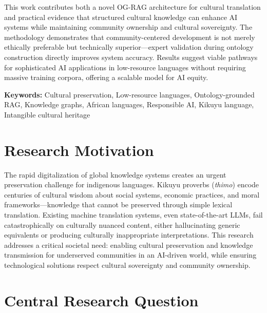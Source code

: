 \documentclass[11pt,a4paper]{article}
\begin{document}
This work contributes both a novel OG-RAG architecture for cultural translation and practical evidence that structured cultural knowledge can enhance AI systems while maintaining community ownership and cultural sovereignty. The methodology demonstrates that community-centered development is not merely ethically preferable but technically superior---expert validation during ontology construction directly improves system accuracy. Results suggest viable pathways for sophisticated AI applications in low-resource languages without requiring massive training corpora, offering a scalable model for AI equity.

\vspace{5pt}

\noindent\textbf{Keywords:} Cultural preservation, Low-resource languages, Ontology-grounded RAG, Knowledge graphs, African languages, Responsible AI, Kikuyu language, Intangible cultural heritage

\vspace{10pt}

\section*{Research Motivation}

The rapid digitalization of global knowledge systems creates an urgent preservation challenge for indigenous languages. Kikuyu proverbs (\emph{thimo}) encode centuries of cultural wisdom about social systems, economic practices, and moral frameworks---knowledge that cannot be preserved through simple lexical translation. Existing machine translation systems, even state-of-the-art LLMs, fail catastrophically on culturally nuanced content, either hallucinating generic equivalents or producing culturally inappropriate interpretations. This research addresses a critical societal need: enabling cultural preservation and knowledge transmission for underserved communities in an AI-driven world, while ensuring technological solutions respect cultural sovereignty and community ownership.

\vspace{10pt}

\section*{Central Research Question}

\begin{center}
\end{center}
\end{document}

